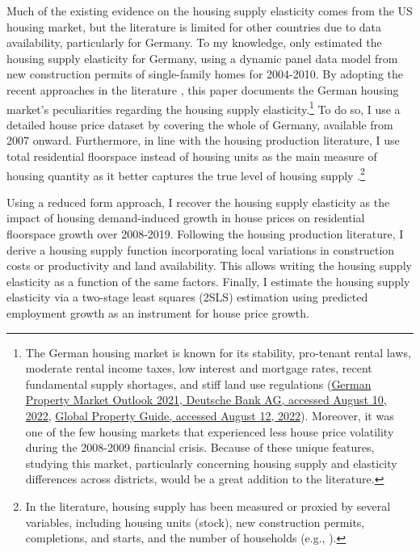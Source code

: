 \documentclass[
  12pt,
]{article}
\begin{document}
Much of the existing evidence on the housing supply elasticity comes
from the US housing market, but the literature is limited for other
countries due to data availability, particularly for Germany. To my
knowledge, only \citet{lerbs_2014} estimated the housing supply
elasticity for Germany, using a dynamic panel data model from new
construction permits of single-family homes for 2004-2010. By adopting
the recent approaches in the literature
\citep{saiz_2010, hilber_vermeulen_2016, baum-snow_han_2019}, this paper
documents the German housing market's peculiarities regarding the
housing supply elasticity.\footnote{The German housing market is known
  for its stability, pro-tenant rental laws, moderate rental income
  taxes, low interest and mortgage rates, recent fundamental supply
  shortages, and stiff land use regulations
  (\href{https://www.dbresearch.com/PROD/RPS_EN-PROD/PROD_0000000000517463/Outlook_for_the_German_residential_property_market.pdf?undefined&realload=OGCzKhorommVYqr3DKzCKCT/4~0T75BVVmGs5XHbQs3QdBI~xyjvWG3i2CAeU6MJ}{German
  Property Market Outlook 2021, Deutsche Bank AG, accessed August 10,
  2022},
  \href{https://www.globalpropertyguide.com/Europe/Germany}{Global
  Property Guide, accessed August 12, 2022}). Moreover, it was one of
  the few housing markets that experienced less house price volatility
  during the 2008-2009 financial crisis. Because of these unique
  features, studying this market, particularly concerning housing supply
  and elasticity differences across districts, would be a great addition
  to the literature.} To do so, I use a detailed house price dataset by
\citet{rwi_redhk_2020} covering the whole of Germany, available from
2007 onward. Furthermore, in line with the housing production
literature, I use total residential floorspace instead of housing units
as the main measure of housing quantity as it better captures the true
level of housing supply
\citep{baum-snow_han_2019, epple_etal_2010}.\footnote{In the literature,
  housing supply has been measured or proxied by several variables,
  including housing units (stock), new construction permits,
  completions, and starts, and the number of households (e.g.,
  \citet{saiz_2010}).}

Using a reduced form approach, I recover the housing supply elasticity
as the impact of housing demand-induced growth in house prices on
residential floorspace growth over 2008-2019. Following the housing
production literature, I derive a housing supply function incorporating
local variations in construction costs or productivity and land
availability. This allows writing the housing supply elasticity as a
function of the same factors. Finally, I estimate the housing supply
elasticity via a two-stage least squares (2SLS) estimation using
predicted employment growth as an instrument for house price growth.
\end{document}
